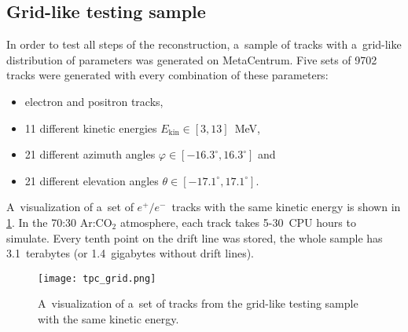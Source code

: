 		\subsection{Grid-like testing sample}
		\label{sec:microgrid}
			In order to test all steps of the reconstruction, a~sample of tracks with a~grid-like distribution of parameters was generated on MetaCentrum. Five sets of 9702 tracks were generated with every combination of these parameters:
				\begin{itemize}[nosep]
					\item electron and positron tracks,
					\item 11 different kinetic energies $E_\text{kin}\in[3,13]$~MeV,
					\item 21 different azimuth angles $\varphi \in [-16.3^\circ,16.3^\circ]$ and
					\item 21 different elevation angles $\theta \in [-17.1^\circ,17.1^\circ]$.
				\end{itemize}
			A~visualization of a~set of $e^+/e^-$~tracks with the same kinetic energy is shown in \cref{fig:microgrid}. In the 70:30 Ar:CO$_2$ atmosphere, each track takes 5-30~CPU hours to simulate. Every tenth point on the drift line was stored, the whole sample has 3.1~terabytes (or 1.4~gigabytes without drift lines).
			
				\begin{figure}
					\centering
					\texttt{[image: tpc\_grid.png]}
					\caption{A~visualization of a~set of tracks from the grid-like testing sample with the same kinetic energy.}
					\label{fig:microgrid}
				\end{figure}
	
